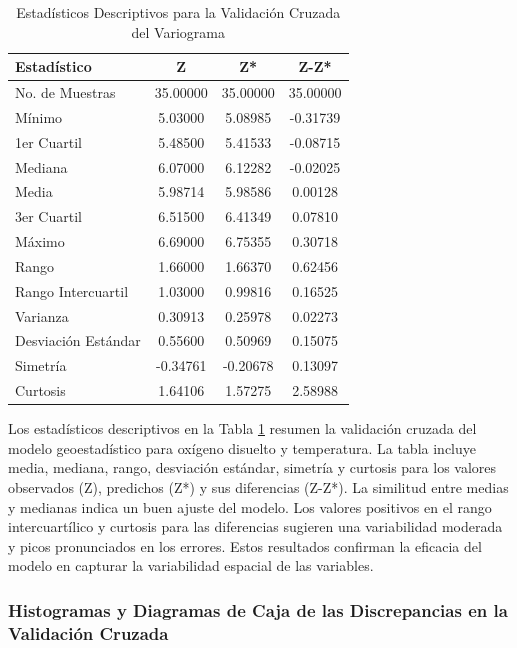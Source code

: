 \begin{table}[!htb]
\centering
\caption{Estadísticos Descriptivos para la Validación Cruzada del Variograma}
\label{od_tem}
\begin{tabular}{lccc}
\toprule
Estadístico & Z & Z* & Z-Z* \\
\midrule
No. de Muestras & 35.00000 & 35.00000 & 35.00000 \\
Mínimo & 5.03000 & 5.08985 & -0.31739 \\
1er Cuartil & 5.48500 & 5.41533 & -0.08715 \\
Mediana & 6.07000 & 6.12282 & -0.02025 \\
Media & 5.98714 & 5.98586 & 0.00128 \\
3er Cuartil & 6.51500 & 6.41349 & 0.07810 \\
Máximo & 6.69000 & 6.75355 & 0.30718 \\
Rango & 1.66000 & 1.66370 & 0.62456 \\
Rango Intercuartil & 1.03000 & 0.99816 & 0.16525 \\
Varianza & 0.30913 & 0.25978 & 0.02273 \\
Desviación Estándar & 0.55600 & 0.50969 & 0.15075 \\
Simetría & -0.34761 & -0.20678 & 0.13097 \\
Curtosis & 1.64106 & 1.57275 & 2.58988 \\
\bottomrule
\end{tabular}
\end{table}

Los estadísticos descriptivos en la Tabla \ref{od_tem} resumen la validación cruzada del modelo geoestadístico para oxígeno disuelto y temperatura. La tabla incluye media, mediana, rango, desviación estándar, simetría y curtosis para los valores observados (Z), predichos (Z*) y sus diferencias (Z-Z*). La similitud entre medias y medianas indica un buen ajuste del modelo. Los valores positivos en el rango intercuartílico y curtosis para las diferencias sugieren una variabilidad moderada y picos pronunciados en los errores. Estos resultados confirman la eficacia del modelo en capturar la variabilidad espacial de las variables.

\subsubsection{ Histogramas y Diagramas de Caja de las Discrepancias en la Validación Cruzada}

